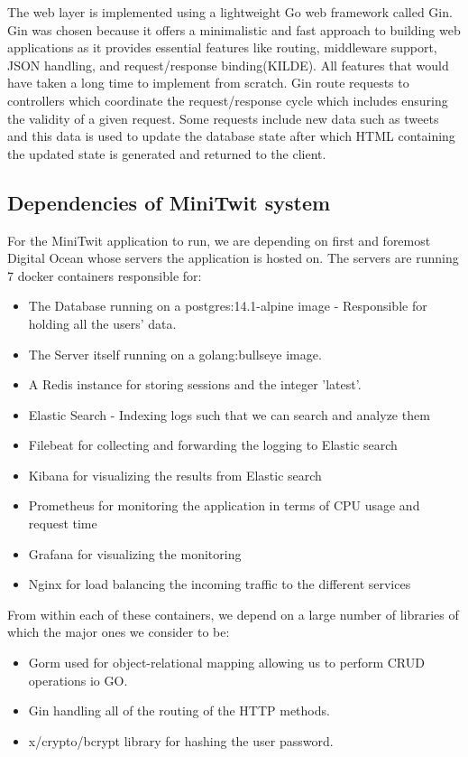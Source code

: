 The web layer is implemented using a lightweight Go web framework called Gin. 
Gin was chosen because it offers a minimalistic and fast approach to building web applications as it provides 
essential features like routing, middleware support, JSON handling, and request/response binding(KILDE). 
All features that would have taken a long time to implement from scratch. Gin route requests to controllers 
which coordinate the request/response cycle which includes ensuring the validity of a given request. 
Some requests include new data such as tweets and this data is used to update the database state after 
which HTML containing the updated state is generated and returned to the client. 


\subsection{Dependencies of MiniTwit system}

For the MiniTwit application to run, we are depending on first and foremost Digital Ocean whose servers the application is 
hosted on. The servers are running 7 docker containers responsible for: 
\begin{itemize}
    \item The Database running on a postgres:14.1-alpine image - Responsible for holding all the users' data.
    \item The Server itself running on a golang:bullseye image.
    \item A Redis instance for storing sessions and the integer 'latest'.
    \item Elastic Search - Indexing logs such that we can search and analyze them
    \item Filebeat for collecting and forwarding the logging to Elastic search
    \item Kibana for visualizing the results from Elastic search
    \item Prometheus for monitoring the application in terms of CPU usage and request time
    \item Grafana for visualizing the monitoring
    \item Nginx for load balancing the incoming traffic to the different services
\end{itemize}

From within each of these containers, we depend on a large number of libraries of which the major ones we consider to be:
\begin{itemize}
    \item Gorm used for object-relational mapping allowing us to perform CRUD operations io GO.
    \item Gin handling all of the routing of the HTTP methods.
    \item x/crypto/bcrypt library for hashing the user password.
\end{itemize}

